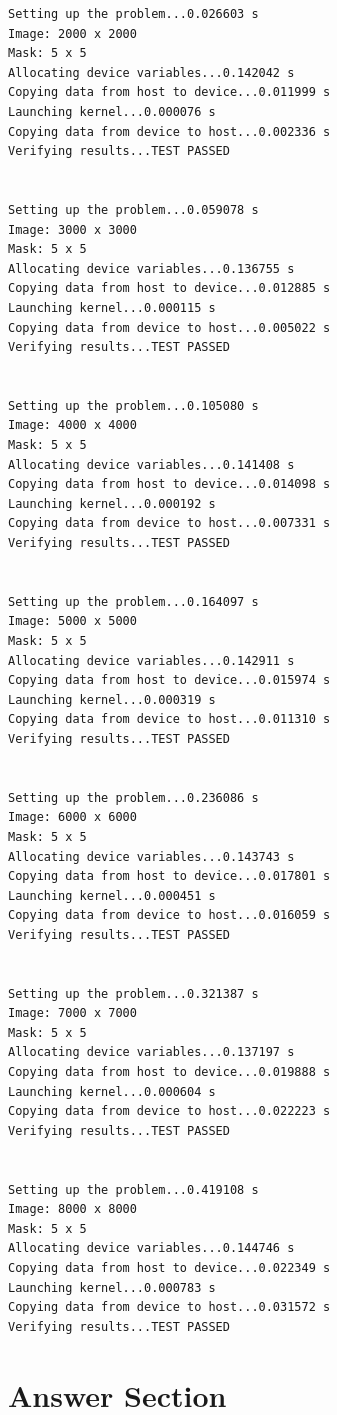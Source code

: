 \documentclass{article}
\begin{document}
\begin{verbatim}
Setting up the problem...0.026603 s
Image: 2000 x 2000
Mask: 5 x 5
Allocating device variables...0.142042 s
Copying data from host to device...0.011999 s
Launching kernel...0.000076 s
Copying data from device to host...0.002336 s
Verifying results...TEST PASSED


Setting up the problem...0.059078 s
Image: 3000 x 3000
Mask: 5 x 5
Allocating device variables...0.136755 s
Copying data from host to device...0.012885 s
Launching kernel...0.000115 s
Copying data from device to host...0.005022 s
Verifying results...TEST PASSED


Setting up the problem...0.105080 s
Image: 4000 x 4000
Mask: 5 x 5
Allocating device variables...0.141408 s
Copying data from host to device...0.014098 s
Launching kernel...0.000192 s
Copying data from device to host...0.007331 s
Verifying results...TEST PASSED


Setting up the problem...0.164097 s
Image: 5000 x 5000
Mask: 5 x 5
Allocating device variables...0.142911 s
Copying data from host to device...0.015974 s
Launching kernel...0.000319 s
Copying data from device to host...0.011310 s
Verifying results...TEST PASSED


Setting up the problem...0.236086 s
Image: 6000 x 6000
Mask: 5 x 5
Allocating device variables...0.143743 s
Copying data from host to device...0.017801 s
Launching kernel...0.000451 s
Copying data from device to host...0.016059 s
Verifying results...TEST PASSED


Setting up the problem...0.321387 s
Image: 7000 x 7000
Mask: 5 x 5
Allocating device variables...0.137197 s
Copying data from host to device...0.019888 s
Launching kernel...0.000604 s
Copying data from device to host...0.022223 s
Verifying results...TEST PASSED


Setting up the problem...0.419108 s
Image: 8000 x 8000
Mask: 5 x 5
Allocating device variables...0.144746 s
Copying data from host to device...0.022349 s
Launching kernel...0.000783 s
Copying data from device to host...0.031572 s
Verifying results...TEST PASSED
\end{verbatim}

\section{Answer Section}
\end{document}
